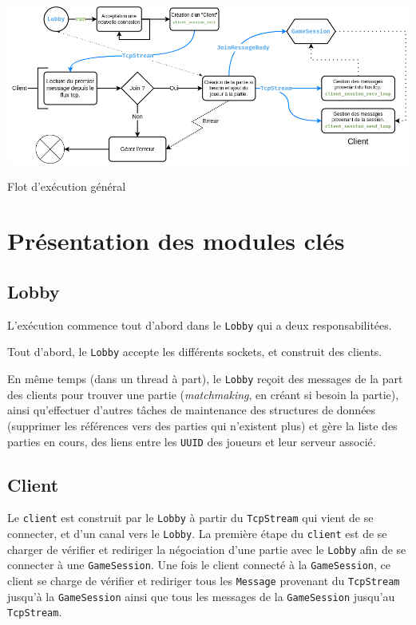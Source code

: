 \documentclass{EPUProjetDi}
\begin{document}
\begin{center}
  \includegraphics[width=\linewidth]{Diagramme flux.png}
  \label{fig:DiagrammeFlux}

  Flot d'exécution général
\end{center}

\chapter{Présentation des modules clés}

\section{Lobby}

L'exécution commence tout d'abord dans le \verb|Lobby| qui a deux responsabilitées.

Tout d'abord, le \verb|Lobby| accepte les différents sockets, et construit des clients.

En même temps (dans un thread à part), le \verb|Lobby| reçoit des messages de la part des clients pour trouver une partie (\textit{matchmaking}, en créant si besoin la partie), ainsi qu'effectuer d'autres tâches de maintenance des structures de données (supprimer les références vers des parties qui n'existent plus) et gère la liste des parties en cours, des liens entre les \verb|UUID| des joueurs et leur serveur associé.

\section{Client}

Le \verb|client| est construit par le \verb|Lobby| à partir du \verb|TcpStream| qui vient de se connecter, et d'un canal vers le \verb|Lobby|. La première étape du \verb|client| est de se charger de vérifier et rediriger la négociation d'une partie avec le \verb|Lobby| afin de se connecter à une \verb|GameSession|. Une fois le client connecté à la \verb|GameSession|, ce client se charge de vérifier et rediriger tous les \verb|Message| provenant du \verb|TcpStream| jusqu'à la \verb|GameSession| ainsi que tous les messages de la \verb|GameSession| jusqu'au \verb|TcpStream|.
\end{document}
